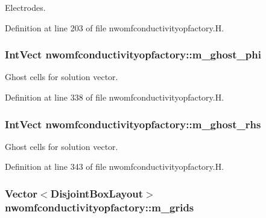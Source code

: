 Electrodes. 



Definition at line 203 of file nwomfconductivityopfactory.\+H.

\subsubsection[{\texorpdfstring{m\+\_\+ghost\+\_\+phi}{m_ghost_phi}}]{\setlength{\rightskip}{0pt plus 5cm}Int\+Vect nwomfconductivityopfactory\+::m\+\_\+ghost\+\_\+phi\hspace{0.3cm}{\ttfamily [protected]}}\hypertarget{classnwomfconductivityopfactory_a439703359b0e0adb71835e7266ddca5e}{}\label{classnwomfconductivityopfactory_a439703359b0e0adb71835e7266ddca5e}


Ghost cells for solution vector. 



Definition at line 338 of file nwomfconductivityopfactory.\+H.

\subsubsection[{\texorpdfstring{m\+\_\+ghost\+\_\+rhs}{m_ghost_rhs}}]{\setlength{\rightskip}{0pt plus 5cm}Int\+Vect nwomfconductivityopfactory\+::m\+\_\+ghost\+\_\+rhs\hspace{0.3cm}{\ttfamily [protected]}}\hypertarget{classnwomfconductivityopfactory_a9fafc9f13a6344fa81001d293091b2e0}{}\label{classnwomfconductivityopfactory_a9fafc9f13a6344fa81001d293091b2e0}


Ghost cells for solution vector. 



Definition at line 343 of file nwomfconductivityopfactory.\+H.

\subsubsection[{\texorpdfstring{m\+\_\+grids}{m_grids}}]{\setlength{\rightskip}{0pt plus 5cm}Vector$<$Disjoint\+Box\+Layout$>$ nwomfconductivityopfactory\+::m\+\_\+grids\hspace{0.3cm}{\ttfamily [protected]}}\hypertarget{classnwomfconductivityopfactory_ae0f196edcb4c195efd6a6663e11ac75d}{}\label{classnwomfconductivityopfactory_ae0f196edcb4c195efd6a6663e11ac75d}


